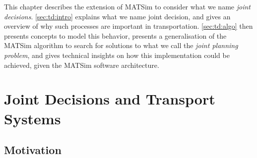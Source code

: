 { %


\newcommand\authoranddate{\citet}
\newcommand\eg{\emph{e.g.}\xspace}
\newcommand\ie{\emph{i.e.}\xspace}
\newcommand\pudptw{Pick-Up and Delivery Problem With Time Windows\xspace}
\newcommand\structeqmodel{structural equation model\xspace}
\newcommand\ga{genetic algorithm\xspace}
\newcommand\gas{genetic algorithms\xspace}
\newcommand\Gas{Genetic algorithms\xspace}
\newcommand\matsim{MATSim\xspace}

\newcommand\insfig[2]{%
	\insfigwidth{#1}{#2}{.8\textwidth}
}
\newcommand\insfigwidth[3]{%
\createfigure{#1}{#1}{}{%
		\texttt{[image: extending/figures/Jointtrips/\#2]}%
		}{}%
}

\newcommand\inssubfigwidth[3]{%
\createsubfigure{#2}{%
		\texttt{[image: extending/figures/Jointtrips/\#3]}%
		}{}{\quad}%
}
\newcommand\inssubfig[2]{%
\inssubfigwidth{.46\textwidth}{#1}{#2}%
}
\newcommand\insfigwithsubfigs[2]{%
\createfigure{#1}{#1}{}{%
		#2%
		}{}%
}


This chapter describes the extension of \matsim to consider what we name \emph{joint decisions}.
\cref{sec:td:intro} explains what we name joint decision, and gives an overview of why such processes
are important in transportation.
\cref{sec:td:algo} then presents concepts to model this behavior,
presents a generalisation of the \matsim algorithm to search for solutions to what
we call the \emph{joint planning problem},
and gives technical insights on how this implementation could be achieved,
given the \matsim software architecture.

\section{Joint Decisions and Transport Systems\label{sec:td:intro}}

\subsection{Motivation}

}
